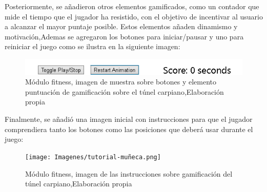 Posteriormente, se añadieron otros elementos gamificados, como un contador que mide el tiempo que el jugador ha resistido, con el objetivo de incentivar al usuario a alcanzar el mayor puntaje posible. Estos elementos añaden dinamismo y motivación,Ademas se agregaron los botones para iniciar/pausar  y uno para reiniciar el juego como se ilustra en la siguiente imagen:

\begin{figure}[H]
  \centering
  \includegraphics[width=0.6\linewidth]{Imagenes/Fitness2.png}
  \caption{Módulo fitness, imagen de muestra sobre botones y elemento puntuación de gamificación sobre el túnel carpiano,Elaboración propia}
  \label{fig:imagen2fitness}
\end{figure}

Finalmente, se añadió una imagen inicial con instrucciones para que el jugador comprendiera tanto los botones como las posiciones que deberá usar durante el juego:
\begin{figure}[H]
  \centering
  \texttt{[image: Imagenes/tutorial-muñeca.png]}
  \caption{Módulo fitness, imagen de las instrucciones sobre gamificación del túnel carpiano,Elaboración propia}
  \label{fig:imagen3fitness}
\end{figure}



